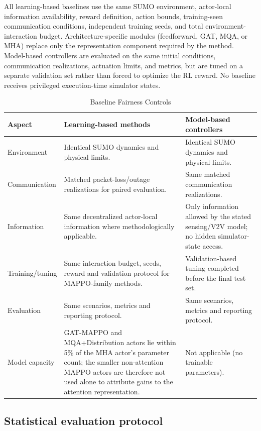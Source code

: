 \documentclass{ieeeaccess}
\begin{document}
All learning-based baselines use the same SUMO environment, actor-local information availability, reward definition, action bounds, training-seen communication conditions, independent training seeds, and total environment-interaction budget. Architecture-specific modules (feedforward, GAT, MQA, or MHA) replace only the representation component required by the method. Model-based controllers are evaluated on the same initial conditions, communication realizations, actuation limits, and metrics, but are tuned on a separate validation set rather than forced to optimize the RL reward. No baseline receives privileged execution-time simulator states.

\begin{table}[htbp]
\centering
\caption{Baseline Fairness Controls}
\label{tab:baseline_fairness}
\renewcommand{\arraystretch}{1.12}
\begin{tabularx}{\textwidth}{|p{3.0cm}|X|X|}
\hline
\textbf{Aspect} & \textbf{Learning-based methods} & \textbf{Model-based controllers} \\ \hline
Environment & Identical SUMO dynamics and physical limits. & Identical SUMO dynamics and physical limits. \\ \hline
Communication & Matched packet-loss/outage realizations for paired evaluation. & Same matched communication realizations. \\ \hline
Information & Same decentralized actor-local information where methodologically applicable. & Only information allowed by the stated sensing/V2V model; no hidden simulator-state access. \\ \hline
Training/tuning & Same interaction budget, seeds, reward and validation protocol for MAPPO-family methods. & Validation-based tuning completed before the final test set. \\ \hline
Evaluation & Same scenarios, metrics and reporting protocol. & Same scenarios, metrics and reporting protocol. \\ \hline
Model capacity & GAT-MAPPO and MQA+Distribution actors lie within 5\% of the MHA actor's parameter count; the smaller non-attention MAPPO actors are therefore not used alone to attribute gains to the attention representation. & Not applicable (no trainable parameters). \\ \hline
\end{tabularx}
\end{table}

\subsection{Statistical evaluation protocol}
\label{sec:statistical_protocol}
\end{document}
